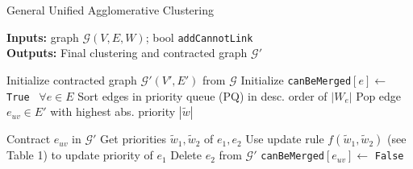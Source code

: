 \begin{algorithm}
  \caption{General Unified Agglomerative Clustering}
   \hspace*{\algorithmicindent} \textbf{Inputs:} graph $\mathcal{G}(V,E,W)$; bool {\color{blue}\texttt{addCannotLink}}  \\
  \hspace*{\algorithmicindent} \textbf{Outputs:} Final clustering and contracted graph $\mathcal{G}'$\\
  \hspace*{\algorithmicindent} 
  \begin{algorithmic}[1]


      \State Initialize contracted graph $\mathcal{G}'(V',E')$ from $\mathcal{G}$
      \State Initialize \texttt{canBeMerged}$[e] \gets$ \texttt{True} $\,\,\, \forall e\in E$
      \State Sort edges in priority queue (PQ) in desc. order of $|W_e|$ 
      \State
        \State Pop edge $e_{uv}\in E'$ with highest abs. priority $|\tilde{w}|$
        \State
          
          
          \State Contract $e_{uv}$ in $\mathcal{G}'$
            \State Get priorities $\tilde{w}_1, \tilde{w}_2$ of $e_1,e_2$
            \State Use update rule $f(\tilde{w}_1,\tilde{w}_2)$ (see Table 1) to 
            \Statex \hspace{\algorithmicindent}\hspace{\algorithmicindent}\hspace{\algorithmicindent}\hspace{\algorithmicindent} update priority of $e_1$
            \State Delete $e_2$ from $\mathcal{G}'$
          \EndFor
        \EndIf
        \State
          \State \texttt{canBeMerged}$[e_{uv}] \gets$ \texttt{False}
        \EndIf
      \EndWhile



\end{algorithmic}
\end{algorithm}
